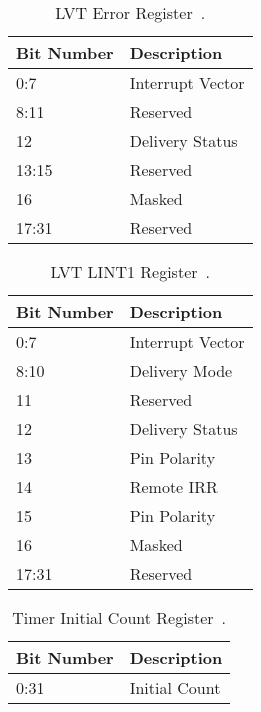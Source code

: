 \begin{table}[H]
  \centering
  \begin{tabularx}{1.0\textwidth}{| X | X |}
    \hline
    \textbf{Bit Number} & \textbf{Description} \\ \hline\hline
    0:7                 & Interrupt Vector     \\ \hline
    8:11                & Reserved             \\ \hline
    12                  & Delivery Status      \\ \hline
    13:15               & Reserved             \\ \hline
    16                  & Masked               \\ \hline
    17:31               & Reserved             \\ \hline
  \end{tabularx}
  \caption{LVT Error Register~\cite[sec.~3.11.5.1]{ia32}.}
  \label{tab:lapicregslvterr}
\end{table}

\begin{table}[H]
  \centering
  \begin{tabularx}{1.0\textwidth}{| X | X |}
    \hline
    \textbf{Bit Number} & \textbf{Description} \\ \hline\hline
    0:7                 & Interrupt Vector     \\ \hline
    8:10                & Delivery Mode        \\ \hline
    11                  & Reserved             \\ \hline
    12                  & Delivery Status      \\ \hline
    13                  & Pin Polarity         \\ \hline
    14                  & Remote IRR           \\ \hline
    15                  & Pin Polarity         \\ \hline
    16                  & Masked               \\ \hline
    17:31               & Reserved             \\ \hline
  \end{tabularx}
  \caption{LVT LINT1 Register~\cite[sec.~3.11.5.1]{ia32}.}
  \label{tab:lapicregslvtlint}
\end{table}

\begin{table}[H]
  \centering
  \begin{tabularx}{1.0\textwidth}{| X | X |}
    \hline
    \textbf{Bit Number} & \textbf{Description} \\ \hline\hline
    0:31                & Initial Count        \\ \hline
  \end{tabularx}
  \caption{Timer Initial Count Register~\cite[sec.~3.11.5.4]{ia32}.}
  \label{tab:lapicregstimerinit}
\end{table}

